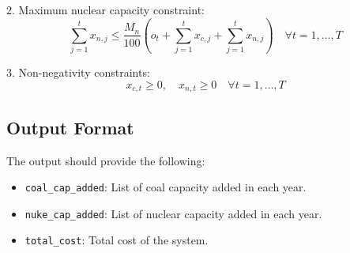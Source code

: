 \documentclass{article}
\begin{document}
2. Maximum nuclear capacity constraint:
\[
\sum_{j=1}^{t} x_{n,j} \leq \frac{M_n}{100} \left( o_t + \sum_{j=1}^{t} x_{c,j} + \sum_{j=1}^{t} x_{n,j} \right) \quad \forall t = 1, \ldots, T
\]

3. Non-negativity constraints:
\[
x_{c,t} \geq 0, \quad x_{n,t} \geq 0 \quad \forall t = 1, \ldots, T
\]

\subsection*{Output Format}
The output should provide the following:
\begin{itemize}
    \item \texttt{coal\_cap\_added}: List of coal capacity added in each year.
    \item \texttt{nuke\_cap\_added}: List of nuclear capacity added in each year.
    \item \texttt{total\_cost}: Total cost of the system.
\end{itemize}
\end{document}

